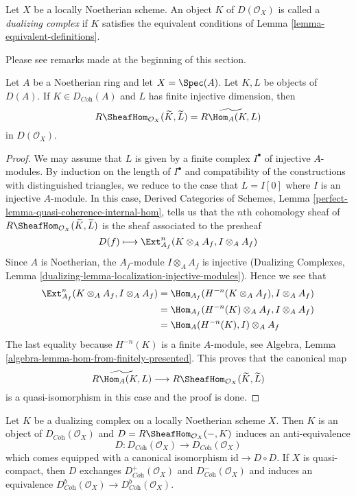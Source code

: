 \begin{definition}
\label{definition-dualizing-scheme}
Let $X$ be a locally Noetherian scheme. An object $K$ of
$D(\mathcal{O}_X)$ is called a {\it dualizing complex} if
$K$ satisfies the equivalent conditions of
Lemma \ref{lemma-equivalent-definitions}.
\end{definition}

\noindent
Please see remarks made at the beginning of this section.

\begin{lemma}
\label{lemma-affine-duality}
Let $A$ be a Noetherian ring and let $X = \Spec(A)$. Let $K, L$ be objects
of $D(A)$. If $K \in D_{\textit{Coh}}(A)$ and $L$ has finite injective
dimension, then
$$
R\SheafHom_{\mathcal{O}_X}(\widetilde{K}, \widetilde{L})
=
\widetilde{R\Hom_A(K, L)}
$$
in $D(\mathcal{O}_X)$.
\end{lemma}

\begin{proof}
We may assume that $L$ is given by a finite complex $I^\bullet$
of injective $A$-modules. By induction on the length of $I^\bullet$
and compatibility of the constructions with distinguished triangles,
we reduce to the case that $L = I[0]$ where $I$ is an injective $A$-module.
In this case, Derived Categories of Schemes, Lemma
\ref{perfect-lemma-quasi-coherence-internal-hom}, tells us that
the $n$th cohomology sheaf of
$R\SheafHom_{\mathcal{O}_X}(\widetilde{K}, \widetilde{L})$
is the sheaf associated to the presheaf
$$
D(f) \longmapsto \Ext^n_{A_f}(K \otimes_A A_f, I \otimes_A A_f)
$$
Since $A$ is Noetherian, the $A_f$-module $I \otimes_A A_f$ is injective
(Dualizing Complexes, Lemma
\ref{dualizing-lemma-localization-injective-modules}). Hence we see that
\begin{align*}
\Ext^n_{A_f}(K \otimes_A A_f, I \otimes_A A_f)
& =
\Hom_{A_f}(H^{-n}(K \otimes_A A_f), I \otimes_A A_f) \\
& =
\Hom_{A_f}(H^{-n}(K) \otimes_A A_f, I \otimes_A A_f) \\
& =
\Hom_A(H^{-n}(K), I) \otimes_A A_f
\end{align*}
The last equality because $H^{-n}(K)$ is a finite $A$-module, see
Algebra, Lemma \ref{algebra-lemma-hom-from-finitely-presented}.
This proves that the canonical map
$$
\widetilde{R\Hom_A(K, L)}
\longrightarrow
R\SheafHom_{\mathcal{O}_X}(\widetilde{K}, \widetilde{L})
$$
is a quasi-isomorphism in this case and the proof is done.
\end{proof}

\begin{lemma}
\label{lemma-dualizing-schemes}
Let $K$ be a dualizing complex on a locally Noetherian scheme $X$.
Then $K$ is an object of $D_{\textit{Coh}}(\mathcal{O}_X)$
and $D = R\SheafHom_{\mathcal{O}_X}(-, K)$ induces an anti-equivalence
$$
D :
D_{\textit{Coh}}(\mathcal{O}_X)
\longrightarrow
D_{\textit{Coh}}(\mathcal{O}_X)
$$
which comes equipped with a canonical isomorphism
$\text{id} \to D \circ D$. If $X$ is quasi-compact, then
$D$ exchanges $D^+_{\textit{Coh}}(\mathcal{O}_X)$ and
$D^-_{\textit{Coh}}(\mathcal{O}_X)$ and induces an equivalence
$D^b_{\textit{Coh}}(\mathcal{O}_X) \to D^b_{\textit{Coh}}(\mathcal{O}_X)$.
\end{lemma}

